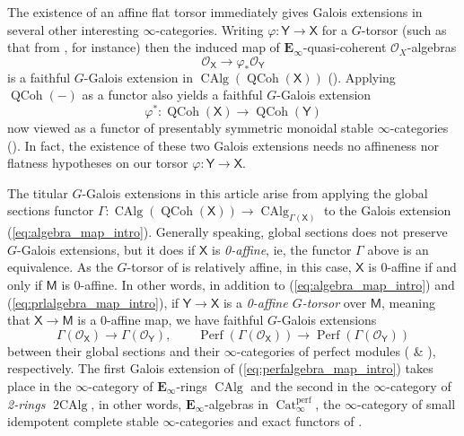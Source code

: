 \documentclass[11pt, a4paper]{article}
\newcommand{\perf}{\mathrm{perf}}
\newcommand{\1}{\mathbf{1}}
\DeclareMathOperator{\CAlg}{CAlg}
\DeclareMathOperator{\tworing}{2CAlg}
\DeclareMathOperator{\Cat}{Cat}
\DeclareMathOperator{\Perf}{Perf}
\DeclareMathOperator{\QCoh}{QCoh}
\newcommand{\E}{\mathbf{E}}
\newcommand{\M}{\mathsf{M}}
\renewcommand{\O}{\mathcal{O}}
\newcommand{\X}{\mathsf{X}}
\newcommand{\Y}{\mathsf{Y}}
\newcommand{\Ga}{\Gamma}
\theoremstyle{plain}
\theoremstyle{definition}
\theoremstyle{remark}\numberwithin{equation}{section}
\begin{document}
The existence of an affine flat torsor immediately gives Galois extensions in several other interesting $\infty$-categories. Writing $\varphi\colon \Y \to \X$ for a $G$-torsor (such as that from , for instance) then the induced map of $\E_\infty$-quasi-coherent $\O_X$-algebras
\begin{equation}\label{eq:algebra_map_intro}\O_\X \to \varphi_\ast \O_\Y\end{equation}
is a faithful $G$-Galois extension in $\CAlg(\QCoh(\X))$ (). Applying $\QCoh(-)$ as a functor also yields a faithful $G$-Galois extension
\begin{equation}\label{eq:prlalgebra_map_intro}\varphi^\ast \colon \QCoh(\X) \to \QCoh(\Y)\end{equation}
now viewed as a functor of presentably symmetric monoidal stable $\infty$-categories (). In fact, the existence of these two Galois extensions needs no affineness nor flatness hypotheses on our torsor $\varphi \colon \Y \to \X$.

The titular $G$-Galois extensions in this article arise from applying the global sections functor $\Ga\colon \CAlg(\QCoh(\X)) \to \CAlg_{\Ga(\X)}$ to the Galois extension (\ref{eq:algebra_map_intro}). Generally speaking, global sections does not preserve $G$-Galois extensions, but it does if $\X$ is \emph{0-affine}, ie, the functor $\Ga$ above is an equivalence. As the $G$-torsor of  is relatively affine, in this case, $\X$ is 0-affine if and only if $\M$ is 0-affine. In other words, in addition to (\ref{eq:algebra_map_intro}) and (\ref{eq:prlalgebra_map_intro}), if $\Y \to \X$ is a \emph{0-affine $G$-torsor} over $\M$, meaning that $\X \to \M$ is a 0-affine map,  we have faithful $G$-Galois extensions
\begin{equation}\label{eq:perfalgebra_map_intro}\Ga(\O_\X) \to \Ga(\O_\Y), \qquad \Perf(\Ga(\O_\X)) \to \Perf(\Ga(\O_\Y))\end{equation}
between their global sections and their $\infty$-categories of perfect modules ( \& ), respectively. The first Galois extension of (\ref{eq:perfalgebra_map_intro}) takes place in the $\infty$-category of $\E_\infty$-rings $\CAlg$ and the second in the $\infty$-category of \emph{2-rings} $\tworing$, in other words, $\E_\infty$-algebras in $\Cat_\infty^\perf$, the $\infty$-category of small idempotent complete stable $\infty$-categories and exact functors of \cite{blumgeptab}.
\end{document}
